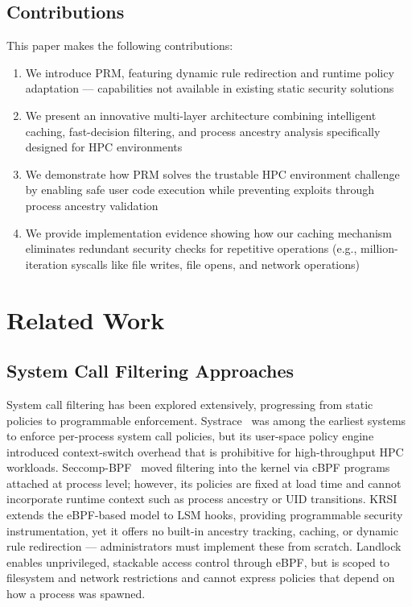\documentclass[]{sn-jnl}
\begin{document}
\subsection{Contributions}

This paper makes the following contributions:

\begin{enumerate}
\item We introduce PRM, featuring dynamic rule redirection and runtime policy
      adaptation --- capabilities not available in existing static security solutions
\item We present an innovative multi-layer architecture combining intelligent
      caching, fast-decision filtering, and process ancestry analysis specifically
      designed for HPC environments
\item We demonstrate how PRM solves the trustable HPC environment challenge by
      enabling safe user code execution while preventing exploits through process
      ancestry validation
\item We provide implementation evidence showing how our caching mechanism
      eliminates redundant security checks for repetitive operations (e.g.,
      million-iteration syscalls like file writes, file opens, and network operations)
\end{enumerate}

\section{Related Work}
\label{sec:related}

\subsection{System Call Filtering Approaches}

System call filtering has been explored extensively, progressing from static
policies to programmable enforcement.
Systrace~\cite{provos2003improving} was among the earliest systems to enforce
per-process system call policies, but its user-space policy engine introduced
context-switch overhead that is prohibitive for high-throughput HPC workloads.
Seccomp-BPF~\cite{edge2015seccomp} moved filtering into the kernel via cBPF
programs attached at process level; however, its policies are fixed at load time
and cannot incorporate runtime context such as process ancestry or UID
transitions.
KRSI~\cite{singh2019krsi} extends the eBPF-based model to LSM hooks, providing
programmable security instrumentation, yet it offers no built-in ancestry
tracking, caching, or dynamic rule redirection --- administrators must implement
these from scratch.
Landlock~\cite{salvan2016landlock} enables unprivileged, stackable access
control through eBPF, but is scoped to filesystem and network restrictions and
cannot express policies that depend on how a process was spawned.
\end{document}
